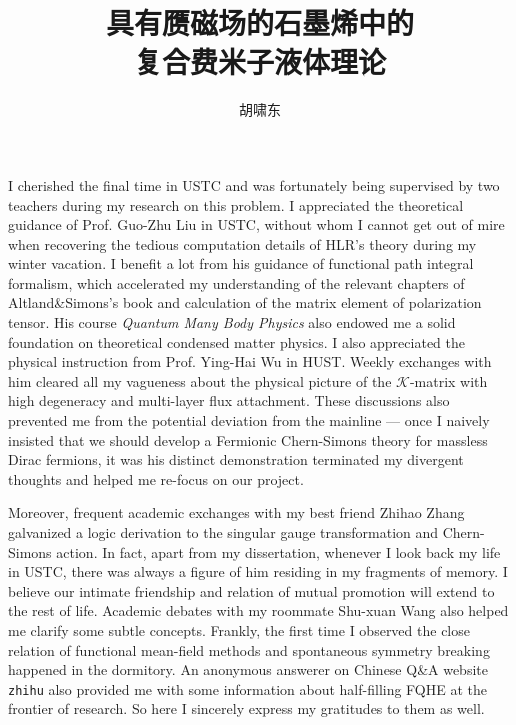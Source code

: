 \documentclass[bachelor,english,numbers]{ustcthesis}
\title{具有赝磁场的石墨烯中的\\复合费米子液体理论}
\author{胡啸东}
\begin{document}
\maketitle

%

\frontmatter

\begin{acknowledgements}
	I cherished the final time in USTC and was fortunately being supervised by two teachers during my research on this problem. I appreciated the theoretical guidance of Prof. Guo-Zhu Liu in USTC, without whom I cannot get out of mire when recovering the tedious computation details of HLR's theory during my winter vacation. I benefit a lot from his guidance of functional path integral formalism, which accelerated my understanding of the relevant chapters of Altland\&Simons's book and calculation of the matrix element of polarization tensor. His course \emph{Quantum Many Body Physics} also endowed me a solid foundation on theoretical condensed matter physics. I also appreciated the physical instruction from Prof. Ying-Hai Wu in HUST. Weekly exchanges with him cleared all my vagueness about the physical picture of the $\mathcal{K}$-matrix with high degeneracy and multi-layer flux attachment. These discussions also prevented me from the potential deviation from the mainline --- once I naively insisted that we should develop a Fermionic Chern-Simons theory for massless Dirac fermions, it was his distinct demonstration terminated my divergent thoughts and helped me re-focus on our project.\par
	
	Moreover, frequent academic exchanges with my best friend Zhihao Zhang galvanized a logic derivation to the singular gauge transformation and Chern-Simons action. In fact, apart from my dissertation, whenever I look back my life in USTC, there was always a figure of him residing in my fragments of memory. I believe our intimate friendship and relation of mutual promotion will extend to the rest of life. Academic debates with my roommate Shu-xuan Wang also helped me clarify some subtle concepts. Frankly, the first time I observed the close relation of functional mean-field methods and spontaneous symmetry breaking happened in the dormitory. An anonymous answerer on Chinese Q\&A website \texttt{zhihu} also provided me with some information about half-filling FQHE at the frontier of research. So here I sincerely express my gratitudes to them as well.
\end{acknowledgements}
\end{document}
